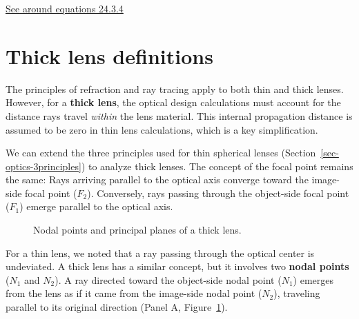 \documentclass[
  letterpaper,
]{book}
\begin{document}
\href{https://phys.libretexts.org/Bookshelves/University_Physics/Physics_(Boundless)/24\%3A_Geometric_Optics/24.3\%3A_Lenses\#:~:text=The\%20focal\%20length\%20of\%20a,surfaces\%20are\%20convex\%20or\%20concave.}{See
around equations 24.3.4}

\section{Thick lens definitions}\label{thick-lens-definitions}

The principles of refraction and ray tracing apply to both thin and
thick lenses. However, for a \textbf{thick lens}, the optical design
calculations must account for the distance rays travel \emph{within} the
lens material. This internal propagation distance is assumed to be zero
in thin lens calculations, which is a key simplification.

We can extend the three principles used for thin spherical lenses
(Section~\ref{sec-optics-3principles}) to analyze thick lenses. The
concept of the focal point remains the same: Rays arriving parallel to
the optical axis converge toward the image-side focal point (\(F_2\)).
Conversely, rays passing through the object-side focal point (\(F_1\))
emerge parallel to the optical axis.

\begin{figure}


\caption{\label{fig-cardinal-points}Nodal points and principal planes of
a thick lens.}

\end{figure}%

For a thin lens, we noted that a ray passing through the optical center
is undeviated. A thick lens has a similar concept, but it involves two
\textbf{nodal points} (\(N_1\) and \(N_2\)). A ray directed toward the
object-side nodal point (\(N_1\)) emerges from the lens as if it came
from the image-side nodal point (\(N_2\)), traveling parallel to its
original direction (Panel A, Figure~\ref{fig-cardinal-points}).
\end{document}
